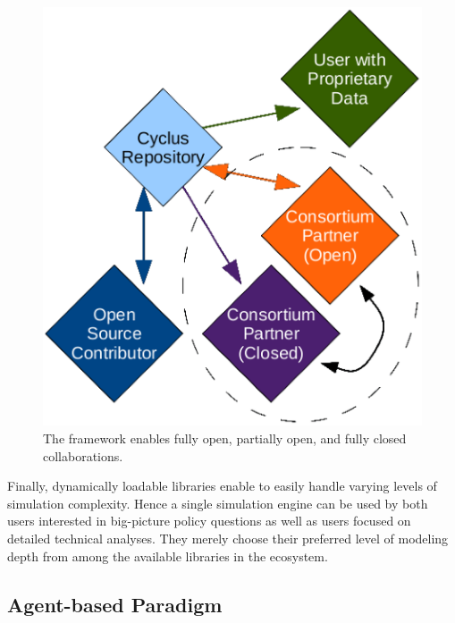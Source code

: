 \begin{figure}[htbp!]
\begin{center}
\includegraphics{./images/modifiedopen.eps}
\end{center}
\caption{The \Cyclus framework enables fully open, partially open, and fully
closed collaborations\cite{carlsen_cyclus_2014}.}
\label{fig:modifiedopen}
\end{figure}

Finally, dynamically loadable libraries enable \Cyclus to easily handle varying levels of simulation complexity. Hence a single
simulation engine can be used by both users interested in big-picture policy
questions as well as users focused on detailed technical
analyses. They merely choose their preferred level of modeling depth from among the
available libraries in the ecosystem.

\subsection{Agent-based Paradigm}
\label{sec:abm}

